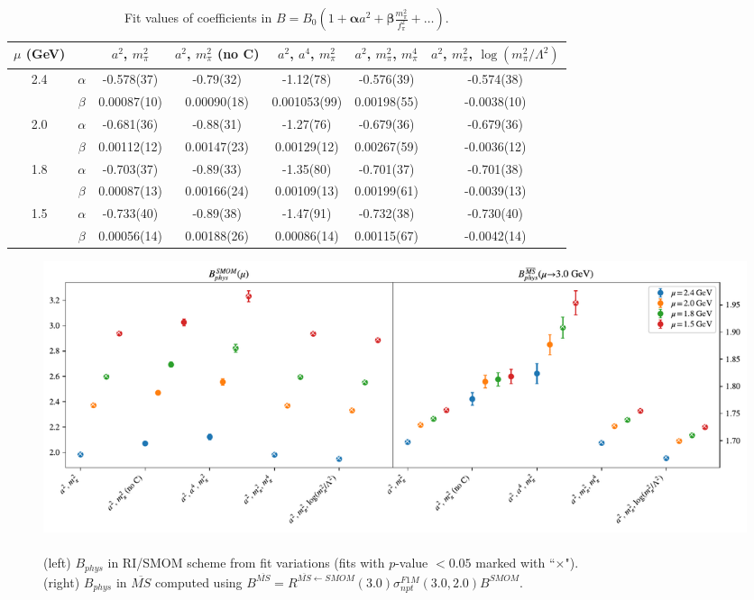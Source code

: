 \documentclass[12pt]{extarticle}
\begin{document}
\begin{table}[h!]
\begin{center}
\begin{tabular}{|c c|c|c|c|c|c|}
\hline
$\mu$ (GeV) &  & $a^2$, $m_\pi^2$& $a^2$, $m_\pi^2$ (no C)& $a^2$, $a^4$, $m_\pi^2$& $a^2$, $m_\pi^2$, $m_\pi^4$& $a^2$, $m_\pi^2$, $\log(m_\pi^2/\Lambda^2)$\\
\hline
\multirow{2}{0.5in}{2.4} & $\alpha$ & -0.578(37)& -0.79(32)& -1.12(78)& -0.576(39)& -0.574(38)\\
 & $\beta$ & 0.00087(10)& 0.00090(18)& 0.001053(99)& 0.00198(55)& -0.0038(10)\\
\hline
\multirow{2}{0.5in}{2.0} & $\alpha$ & -0.681(36)& -0.88(31)& -1.27(76)& -0.679(36)& -0.679(36)\\
 & $\beta$ & 0.00112(12)& 0.00147(23)& 0.00129(12)& 0.00267(59)& -0.0036(12)\\
\hline
\multirow{2}{0.5in}{1.8} & $\alpha$ & -0.703(37)& -0.89(33)& -1.35(80)& -0.701(37)& -0.701(38)\\
 & $\beta$ & 0.00087(13)& 0.00166(24)& 0.00109(13)& 0.00199(61)& -0.0039(13)\\
\hline
\multirow{2}{0.5in}{1.5} & $\alpha$ & -0.733(40)& -0.89(38)& -1.47(91)& -0.732(38)& -0.730(40)\\
 & $\beta$ & 0.00056(14)& 0.00188(26)& 0.00086(14)& 0.00115(67)& -0.0042(14)\\
\hline
\end{tabular}
\caption{Fit values of coefficients in $B = B_0(1 + \mathbf{\alpha} a^2 + \mathbf{\beta} \frac{m_\pi^2}{f_\pi^2} + \ldots)$.}
\end{center}
\end{table}
\begin{figure}
\centering
\includegraphics[page=1, width=1.1\textwidth]{plots/VVmAA_fit_summary.pdf}
\caption{\\(left) $B_{phys}$ in RI/SMOM scheme from fit variations (fits with $p$-value $<0.05$ marked with ``$\times$"). \\(right) $B_{phys}$ in $\overline{MS}$ computed using $B^{\overline{MS}} = R^{\overline{MS}\leftarrow SMOM}(3.0)\sigma_{npt}^{F1M}(3.0, 2.0) B^{SMOM}$.}
\end{figure}
\end{document}
